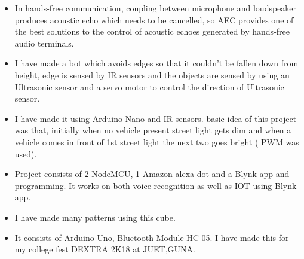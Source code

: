 \begin{itemize}
\item In hands-free communication, coupling between microphone and loudspeaker produces acoustic echo
which needs to be cancelled, so AEC provides one of the best solutions to the control of acoustic echoes
generated by hands-free audio terminals.
\end{itemize}
\smallskip
\smallskip
{}
\begin{itemize}
\item I have made a bot which avoids edges so that it couldn't be fallen down from height, edge is sensed by
IR sensors and the objects are sensed by using an Ultrasonic sensor and a servo motor to control the
direction of Ultrasonic sensor.
\end{itemize}
\smallskip
\smallskip
{}
\begin{itemize}
\item I have made it using Arduino Nano and IR sensors. basic idea of this project was that, initially when no
vehicle present street light gets dim and when a vehicle comes in front of 1st street light the next two
goes bright ( PWM was used).
\end{itemize}
\smallskip
\smallskip
{}
\begin{itemize}
\item Project consists of 2 NodeMCU, 1 Amazon alexa dot and a Blynk app and programming. It works on both
voice recognition as well as IOT using Blynk app.
\end{itemize}
\smallskip
\smallskip
{}
\begin{itemize}
\item I have made many patterns using this cube.
\end{itemize}
\smallskip
\smallskip
{}
\begin{itemize}
\item It consists of Arduino Uno, Bluetooth Module HC-05. I have made this for my college fest DEXTRA 2K18
at JUET,GUNA. 
\end{itemize}
\cvproject{}